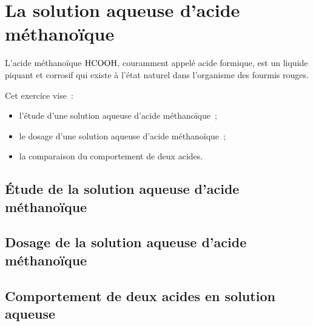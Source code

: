 \section{La solution aqueuse d'acide méthanoïque}
L'acide méthanoïque $\ce{HCOOH}$, couramment appelé acide formique, est un
liquide piquant et corrosif qui existe à l'état naturel dans l'organisme des
fourmis rouges.

Cet exercice vise~:
\begin{itemize}
    \item l'étude d'une solution aqueuse d'acide méthanoïque~;
    \item le dosage d'une solution aqueuse d'acide méthanoïque~;
    \item la comparaison du comportement de deux acides.
\end{itemize}

\subsection{Étude de la solution aqueuse d'acide méthanoïque}


\subsection{Dosage de la solution aqueuse d'acide méthanoïque}


\subsection{Comportement de deux acides en solution aqueuse}

